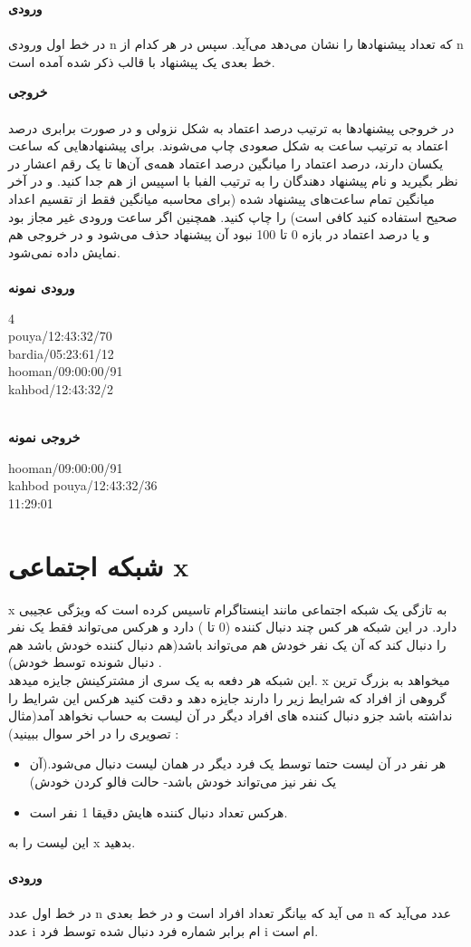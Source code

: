 \documentclass[]{article}
\newcommand{\inputsample}[1]{
    ~\\
    \textbf{ورودی نمونه}
    ~\\
    \begin{tcolorbox}[breakable,boxrule=0pt]
        \begin{latin}
            \large{
                #1
            }
        \end{latin}
    \end{tcolorbox}
}
\newcommand{\outputsample}[1]{
    ~\\
    \textbf{خروجی نمونه}

    \begin{tcolorbox}[breakable,boxrule=0pt]
        \begin{latin}
            \large{
                #1
            }
        \end{latin}
    \end{tcolorbox}
}
\begin{document}
\vspace{1cm}



\textbf{ورودی}
\\ \\
در خط اول ورودی 
n 
که تعداد پیشنهاد‌ها را نشان می‌دهد می‌آید.
سپس در هر کدام از
n
خط بعدی یک پیشنهاد با قالب ذکر شده آمده است. 



\vspace{1cm}

\textbf{خروجی}
\\\\
در خروجی پیشنهادها به ترتیب درصد اعتماد به شکل نزولی و در صورت برابری درصد اعتماد به ترتیب ساعت به شکل صعودی چاپ می‌شوند. برای پیشنهاد‌هایی که ساعت یکسان 
دارند، درصد اعتماد را میانگین درصد اعتماد همه‌ی آن‌ها تا یک رقم اعشار در نظر بگیرید و نام پیشنهاد دهندگان را به ترتیب الفبا با اسپیس از هم جدا کنید.
و در آخر میانگین تمام ساعت‌های پیشنهاد شده (برای محاسبه میانگین فقط از تقسیم اعداد صحیح استفاده کنید کافی است) را چاپ کنید.
 همچنین اگر ساعت ورودی غیر مجاز بود و یا درصد اعتماد در بازه 0 تا 100 نبود آن پیشنهاد حذف می‌شود و در خروجی هم نمایش داده نمی‌شود.
\\


\inputsample{
4
\\
pouya/12:43:32/70
\\
bardia/05:23:61/12
\\
hooman/09:00:00/91
\\
kahbod/12:43:32/2
}

\outputsample{
hooman/09:00:00/91
\\
kahbod pouya/12:43:32/36
\\
11:29:01
}

\newpage
\section{شبکه اجتماعی x}


x به تازگی یک شبکه اجتماعی مانند اینستاگرام تاسیس کرده است که ویژگی عجیبی دارد. در این شبکه هر کس چند دنبال کننده (0 تا ) دارد و هرکس می‌تو‌‌‌اند فقط یک نفر را دنبال کند که آن یک نفر خودش هم می‌تواند باشد(هم دنبال کننده خودش باشد هم دنبال شونده توسط خودش) . \\این شبکه هر دفعه به یک سری از مشترکینش جایزه میدهد. x میخواهد به بزرگ ترین گروهی از افراد که شرایط زیر را دارند جایزه دهد و دقت کنید هرکس این شرایط را نداشته باشد جزو دنبال کننده های افراد دیگر در آن لیست به حساب نخواهد آمد(مثال تصویری را در اخر سوال ببینید)  :
\begin{itemize}
\item
 هر نفر در آن لیست حتما توسط یک فرد دیگر در همان لیست دنبال می‌شود.(آن یک نفر نیز می‌تواند خودش باشد- حالت فالو کردن خودش)
\item
هرکس تعداد دنبال کننده هایش دقیقا 1 نفر است.
\end{itemize}
این لیست را به x بدهید.\\\\
\textbf{ورودی}\\\\
در خط اول عدد n می آید که بیانگر تعداد افراد است و در خط بعدی n عدد می‌آید که عدد i ام برابر شماره فرد دنبال شده توسط فرد i ام است.\\
\end{document}
